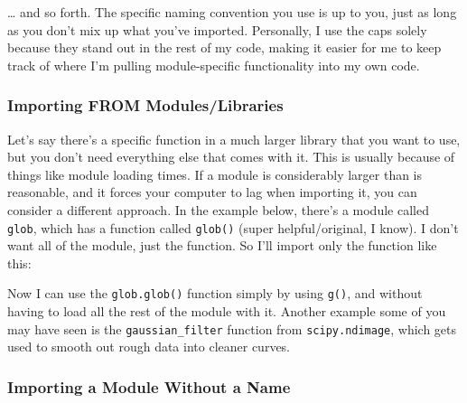 \ldots{} and so forth. The specific naming convention you use is up to
you, just as long as you don't mix up what you've imported. Personally,
I use the caps solely because they stand out in the rest of my code,
making it easier for me to keep track of where I'm pulling
module-specific functionality into my own code.

\hypertarget{importing-from-moduleslibraries}{%
\subsubsection{Importing FROM
Modules/Libraries}\label{importing-from-moduleslibraries}}

Let's say there's a specific function in a much larger library that you
want to use, but you don't need everything else that comes with it. This
is usually because of things like module loading times. If a module is
considerably larger than is reasonable, and it forces your computer to
lag when importing it, you can consider a different approach. In the
example below, there's a module called \texttt{glob}, which has a
function called \texttt{glob()} (super helpful/original, I know). I
don't want all of the module, just the function. So I'll import only the
function like this:

\begin{Shaded}
\begin{Highlighting}[]
\end{Highlighting}
\end{Shaded}

Now I can use the \texttt{glob.glob()} function simply by using
\texttt{g()}, and without having to load all the rest of the module with
it. Another example some of you may have seen is the
\texttt{gaussian\_filter} function from \texttt{scipy.ndimage}, which
gets used to smooth out rough data into cleaner curves.

\begin{Shaded}
\begin{Highlighting}[]
\end{Highlighting}
\end{Shaded}

\hypertarget{importing-a-module-without-a-name}{%
\subsubsection{Importing a Module Without a
Name}\label{importing-a-module-without-a-name}}

